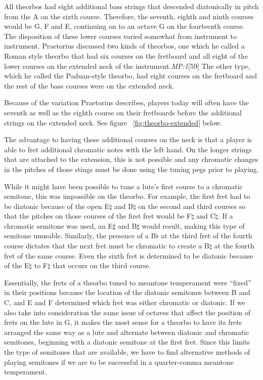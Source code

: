 All theorbos had eight additional bass strings that descended diatonically in pitch from
the A on the sixth course.  Therefore, the seventh, eighth and ninth courses would be G, F
and E, continuing on to an octave G on the fourteenth course.  The disposition of these
lower courses varied somewhat from instrument to instrument.  Praetorius discussed two
kinds of theorbos, one which he called a Roman style theorbo that had six courses on the
fretboard and all eight of the lower courses on the extended neck of the
instrument.\textit{MP:1}[59] The other type, which he called the Paduan-style
theorbo, had eight courses on the fretboard and the rest of the bass courses were on the
extended neck.

Because of the variation Praetorius describes, players today will often have the seventh
as well as the eighth course on their fretboards before the additional strings on the
extended neck. See figure ~\ref{fig:theorbo-extended} below.

The advantage to having these additional courses on the neck is that a
player is able to fret additional chromatic notes with the left hand.  On the longer
strings that are attached to the extension, this is not possible and any chromatic changes
in the pitches of those stings must be done using the tuning pegs prior to playing.

While it might have been possible to tune a lute's first course to a chromatic semitone,
this was impossible on the theorbo. For example, the first fret had to be diatonic because
of the open E$\natural$ and B$\natural$ on the second and third courses so that the
pitches on those courses of the first fret would be F$\natural$ and C$\natural$.  If a
chromatic semitone was used, an E$\sharp$ and B$\sharp$ would result, making this type of
semitone unusable. Similarly, the presence of a B$\flat$ at the third fret of the fourth
course dictates that the next fret must be chromatic to create a B$\natural$ at the fourth
fret of the same course. Even the sixth fret is determined to be diatonic because of the
E$\natural$ to F$\natural$ that occurs on the third course.

Essentially, the frets of a theorbo tuned to meantone temperament were ``fixed'' in
their positions because the location of the diatonic semitones between B and C, and E
and F determined which fret was either chromatic or diatonic.  If we also take into
consideration the same issue of octaves that affect the position of frets on the lute
in G, it makes the most sense for a theorbo to have its frets arranged the same way as
a lute and alternate between diatonic and chromatic semitones, beginning with a
diatonic semitone at the first fret.  Since this limits the type of semitones that are
available, we have to find alternative methods of playing semitones if we are to be
successful in a quarter-comma meantone temperament.

